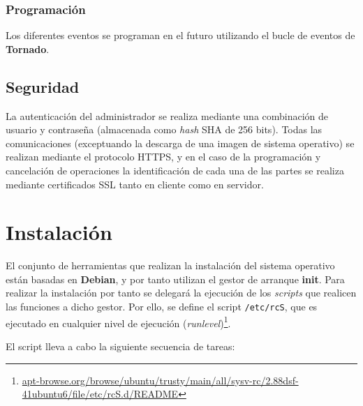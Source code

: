 \documentclass{article}
\begin{document}
\subsubsection{Programación}

Los diferentes eventos se programan en el futuro utilizando el bucle de eventos de \textbf{Tornado}.
\subsection{Seguridad}

La autenticación del administrador se realiza mediante una combinación de usuario y contraseña (almacenada como \textit{hash} SHA de 256 bits). Todas las comunicaciones (exceptuando la descarga de una imagen de sistema operativo) se realizan mediante el protocolo HTTPS, y en el caso de la programación y cancelación de operaciones la identificación de cada una de las partes se realiza mediante certificados SSL tanto en cliente como en servidor.

\section{Instalación}

El conjunto de herramientas que realizan la instalación del sistema operativo están basadas en \textbf{Debian}, y por tanto utilizan el gestor de arranque \textbf{init}. Para realizar la instalación por tanto se delegará la ejecución de los \textit{scripts} que realicen las funciones a dicho gestor. Por ello, se define el script \texttt{/etc/rcS}, que es ejecutado en cualquier nivel de ejecución (\textit{runlevel})\footnote{\href{http://apt-browse.org/browse/ubuntu/trusty/main/all/sysv-rc/2.88dsf-41ubuntu6/file/etc/rcS.d/README}{apt-browse.org/browse/ubuntu/trusty/main/all/sysv-rc/2.88dsf-41ubuntu6/file/etc/rcS.d/README}}. 

El script lleva a cabo la siguiente secuencia de tareas:
\end{document}

